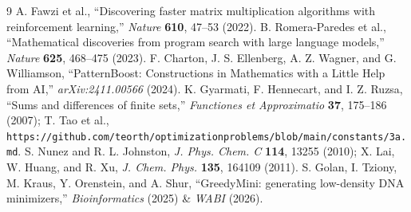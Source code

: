 \documentclass[11pt,a4paper]{article}
\begin{document}
\begin{thebibliography}{9}
 A. Fawzi et al., ``Discovering faster matrix multiplication algorithms with reinforcement learning,'' \emph{Nature} \textbf{610}, 47--53 (2022).
 B. Romera-Paredes et al., ``Mathematical discoveries from program search with large language models,'' \emph{Nature} \textbf{625}, 468--475 (2023).
 F. Charton, J. S. Ellenberg, A. Z. Wagner, and G. Williamson, ``PatternBoost: Constructions in Mathematics with a Little Help from AI,'' \emph{arXiv:2411.00566} (2024).
 K. Gyarmati, F. Hennecart, and I. Z. Ruzsa, ``Sums and differences of finite sets,'' \emph{Functiones et Approximatio} \textbf{37}, 175--186 (2007); T. Tao et al., \texttt{https://github.com/teorth/optimizationproblems/blob/main/constants/3a.md}.
 S. Nunez and R. L. Johnston, \emph{J. Phys. Chem. C} \textbf{114}, 13255 (2010); X. Lai, W. Huang, and R. Xu, \emph{J. Chem. Phys.} \textbf{135}, 164109 (2011).
 S. Golan, I. Tziony, M. Kraus, Y. Orenstein, and A. Shur, ``GreedyMini: generating low-density DNA minimizers,'' \emph{Bioinformatics} (2025) \& \emph{WABI} (2026).
\end{thebibliography}
\end{document}
